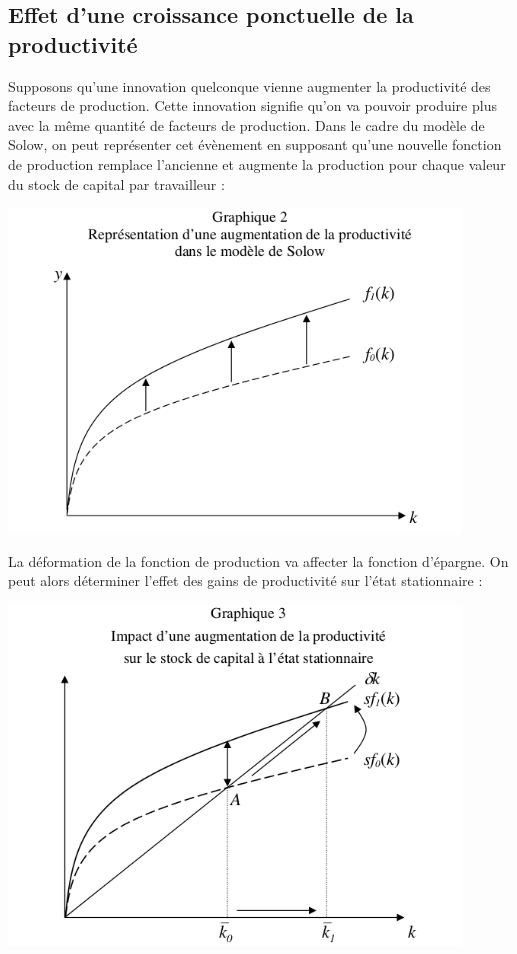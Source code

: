 \documentclass[10pt]{book}
\begin{document}
\subsection{Effet d'une croissance ponctuelle de la productivité}
Supposons qu'une innovation quelconque vienne augmenter la productivité des facteurs de production. Cette innovation signifie qu'on va pouvoir produire plus avec la même quantité de facteurs de production. Dans le cadre du modèle de Solow, on peut représenter cet évènement en supposant qu'une nouvelle fonction de production remplace l'ancienne et augmente la production pour chaque valeur du stock de capital par travailleur : 
\begin{center}
  \includegraphics[width=12cm]{graph6.png}
\end{center}
La déformation de la fonction de production va affecter la fonction d'épargne. On peut alors déterminer l'effet des gains de productivité sur l'état stationnaire : 
\begin{center}
  \includegraphics[width=12cm]{graph7.png}
\end{center}
\end{document}
